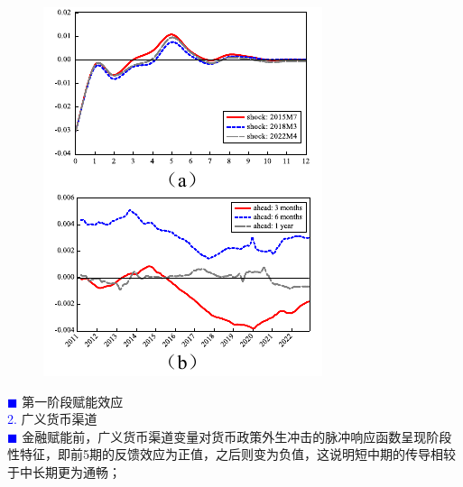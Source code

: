 \documentclass[12pt,aspectratio=169]{ctexbeamer}
\begin{document}
			\begin{frame}
				\frametitle{}
				\begin{figure}
					\centering
					\vspace{3mm}
					\includegraphics[height=0.7\textheight]{figures/fig.5-6}
				\end{figure}
				\vspace{-3mm}
				\textcolor{blue}{\footnotesize $\blacksquare$} \large 第一阶段赋能效应\\
				\hspace{1em}
				\textcolor{blue}{\footnotesize 2.} {\normalsize 广义货币渠道}\\
				\justifying
				\footnotesize
				\hspace{2em}
				\textcolor{blue}{\tiny $\blacksquare$} 金融赋能前，广义货币渠道变量对货币政策外生冲击的脉冲响应函数呈现阶段性特征，即前5期的反馈效应为正值，之后则变为负值，这说明短中期的传导相较于中长期更为通畅；\\

\end{frame}
\end{document}
